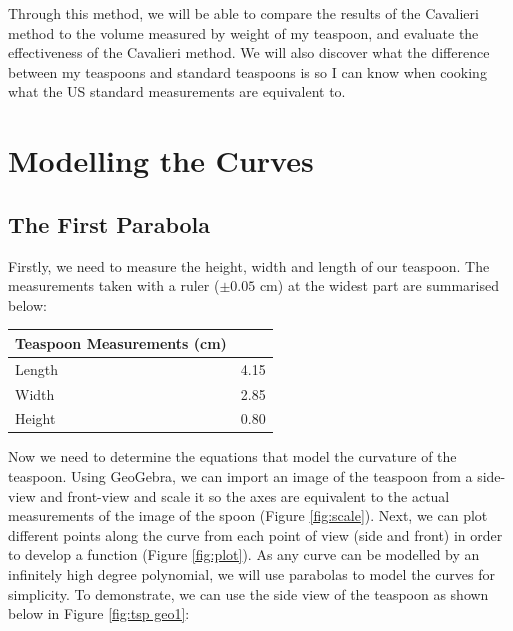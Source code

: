 \documentclass[12pt]{article}
\begin{document}
Through this method, we will be able to compare the results of the Cavalieri method to the volume measured by weight of my teaspoon, and evaluate the effectiveness of the Cavalieri method. We will also discover what the difference between my teaspoons and standard teaspoons is so I can know when cooking what the US standard measurements are equivalent to. 

\section{Modelling the Curves}

\subsection{The First Parabola}

Firstly, we need to measure the height, width and length of our teaspoon. The measurements taken with a ruler ($\pm 0.05$ cm) at the widest part are summarised below:

\begin{center}
    \begin{tabular}{@{} lr @{}}
        \toprule
            Teaspoon Measurements (cm)  \\
        \midrule
            Length & 4.15\\
            Width & 2.85\\
            Height & 0.80\\
        \bottomrule
    \end{tabular}
    \label{tab:measurements}
\end{center}

Now we need to determine the equations that model the curvature of the teaspoon. Using GeoGebra, we can import an image of the teaspoon from a side-view and front-view and scale it so the axes are equivalent to the actual measurements of the image of the spoon (Figure \ref{fig:scale}). Next, we can plot different points along the curve from each point of view (side and front) in order to develop a function (Figure \ref{fig:plot}). As any curve can be modelled by an infinitely high degree polynomial, we will use parabolas to model the curves for simplicity. To demonstrate, we can use the side view of the teaspoon as shown below in Figure \ref{fig:tsp geo1}:
\end{document}

